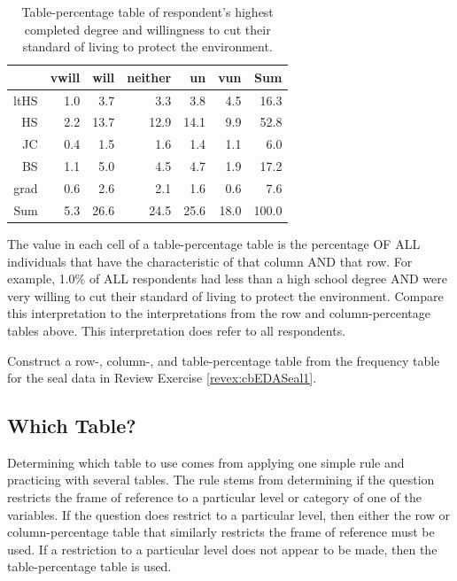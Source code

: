 \documentclass[10pt,openany]{book}\usepackage[]{graphicx}\usepackage[]{color}
\begin{document}
\begin{table}[ht]
\centering
\caption{Table-percentage table of respondent's highest completed degree and willingness to cut their standard of living to protect the environment.} 
\label{tab:EnvTblP}
\begin{tabular}{rrrrrrr}
  \hline
 & vwill & will & neither & un & vun & Sum \\ 
  \hline
ltHS & 1.0 & 3.7 & 3.3 & 3.8 & 4.5 & 16.3 \\ 
  HS & 2.2 & 13.7 & 12.9 & 14.1 & 9.9 & 52.8 \\ 
  JC & 0.4 & 1.5 & 1.6 & 1.4 & 1.1 & 6.0 \\ 
  BS & 1.1 & 5.0 & 4.5 & 4.7 & 1.9 & 17.2 \\ 
  grad & 0.6 & 2.6 & 2.1 & 1.6 & 0.6 & 7.6 \\ 
  Sum & 5.3 & 26.6 & 24.5 & 25.6 & 18.0 & 100.0 \\ 
   \hline
\end{tabular}
\end{table}


The value in each cell of a table-percentage table is the percentage OF ALL individuals that have the characteristic of that column AND that row.  For example, 1.0\% of ALL respondents had less than a high school degree AND were very willing to cut their standard of living to protect the environment.  Compare this interpretation to the interpretations from the row and column-percentage tables above.  This interpretation does refer to all respondents.


\vspace{-12pt}

\begin{exsection}
  \item \label{revex:cbEDASeal2} Construct a row-, column-, and table-percentage table from the frequency table for the seal data in Review Exercise \ref{revex:cbEDASeal1}. 
\end{exsection}


\subsection{Which Table?}
Determining which table to use comes from applying one simple rule and practicing with several tables.  The rule stems from determining if the question restricts the frame of reference to a particular level or category of one of the variables.  If the question does restrict to a particular level, then either the row or column-percentage table that similarly restricts the frame of reference must be used.  If a restriction to a particular level does not appear to be made, then the table-percentage table is used.
\end{document}
